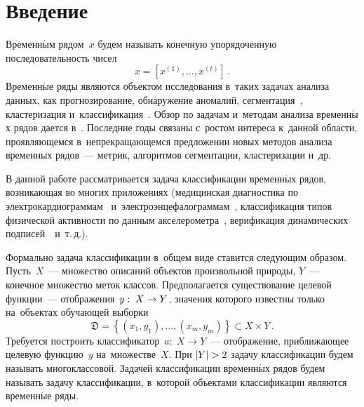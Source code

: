 



\thispagestyle{headings}

\begin{multicols}{2}

\label{st\stat}

\section{Введение}

Временн$\acute{\mbox{ы}}$м рядом~$x$ будем называть конечную упорядоченную 
последовательность чисел
$$
x = \left[x^{(1)}, \dots, x^{(t)}\right]\,.
$$
Временн$\acute{\mbox{ы}}$е ряды являются объектом исследования 
в~таких задачах анализа данных, как прогнозирование,
  обнаружение аномалий, сегментация~\cite{geurts2005segment},
  клас\-те\-ри\-за\-ция и~классификация~\cite{geurts2005segment}.
Обзор по задачам и~методам анализа временн$\acute{\mbox{ы}}$х рядов дается 
в~\cite{Esling:2012:TDM:2379776.2379788}.
Последние годы связаны с~ростом интереса к~данной области, проявляющемся 
в~непрекращающемся предложении новых методов анализа временных рядов~--- метрик, 
алгоритмов сегментации, кластеризации и~др.

В данной работе рассматривается задача классификации временн$\acute{\mbox{ы}}$х рядов, 
возникающая во многих приложениях
  (медицинская диагностика по электрокардиограммам~\cite{basil2014automatic} 
  и~электроэнцефалограммам~\cite{alomari2013automated},
  классификация типов физической активности по данным 
  акселерометра~\cite{Kwapisz:2011:ARU:1964897.1964918},
  верификация динамических подписей~\cite{gruber2006signature}~и~т.\,д.).

Формально задача классификации в~общем виде ставится следующим образом.
Пусть~$X$~--- множество описаний объектов произвольной природы,
$Y$~--- конечное множество меток классов.
Предполагается существование целевой функции~--- отоб\-ра\-же\-ния~$y:\;X
\hm\to Y$,
значения которого известны только на~объектах обучающей выборки
$$
    \mathfrak{D} = \left\{(x_1,y_1),\dots,(x_m,y_m)\right\} \subset X\times Y\,.
$$
Требуется построить классификатор~$a:\;X\to Y$~--- отображение,
приближающее целевую функцию~$y$ на~множестве~$X$.
При $|Y|\hm>2$ задачу классификации будем называть многоклассовой.
Задачей классификации временн$\acute{\mbox{ы}}$х рядов будем называть задачу классификации, 
в~которой объектами классификации являются временн$\acute{\mbox{ы}}$е ряды.


\end{multicols}
